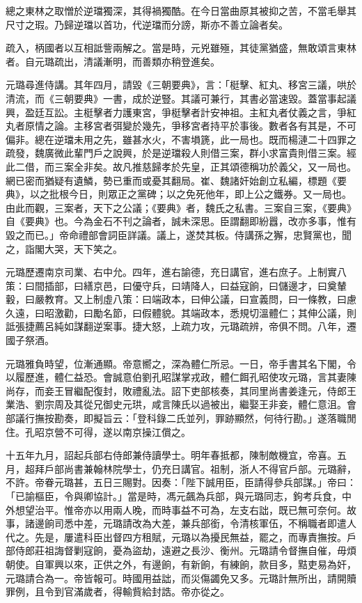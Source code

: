 \begin{pinyinscope}
總之東林之取憎於逆璫獨深，其得禍獨酷。在今日當曲原其被抑之苦，不當毛舉其尺寸之瑕。乃歸逆璫以首功，代逆璫而分謗，斯亦不善立論者矣。

疏入，柄國者以互相詆訾兩解之。當是時，元兇雖殛，其徒黨猶盛，無敢頌言東林者。自元璐疏出，清議漸明，而善類亦稍登進矣。

元璐尋進侍講。其年四月，請毀《三朝要典》，言：「梃擊、紅丸、移宮三議，哄於清流，而《三朝要典》一書，成於逆豎。其議可兼行，其書必當速毀。蓋當事起議興，盈廷互訟。主梃擊者力護東宮，爭梃擊者計安神祖。主紅丸者仗義之言，爭紅丸者原情之論。主移宮者弭變於幾先，爭移宮者持平於事後。數者各有其是，不可偏非。總在逆璫未用之先，雖甚水火，不害塤篪，此一局也。既而楊漣二十四罪之疏發，魏廣微此輩門戶之說興，於是逆璫殺人則借三案，群小求富貴則借三案。經此二借，而三案全非矣。故凡推慈歸孝於先皇，正其頌德稱功於義父，又一局也。網已密而猶疑有遺鱗，勢已重而或憂其翻局。崔、魏諸奸始創立私編，標題《要典》，以之批根今日，則眾正之黨碑；以之免死他年，即上公之鐵券。又一局也。由此而觀，三案者，天下之公議；《要典》者，魏氏之私書。三案自三案，《要典》自《要典》也。今為金石不刊之論者，誠未深思。臣謂翻即紛囂，改亦多事，惟有毀之而已。」帝命禮部會詞臣詳議。議上，遂焚其板。侍講孫之獬，忠賢黨也，聞之，詣閣大哭，天下笑之。

元璐歷遷南京司業、右中允。四年，進右諭德，充日講官，進右庶子。上制實八策：曰間插部，曰繕京邑，曰優守兵，曰靖降人，曰益寇餉，曰儲邊才，曰奠輦轂，曰嚴教育。又上制虛八策：曰端政本，曰伸公議，曰宣義問，曰一條教，曰慮久遠，曰昭激勸，曰勵名節，曰假體貌。其端政本，悉規切溫體仁；其伸公議，則詆張捷薦呂純如謀翻逆案事。捷大怒，上疏力攻，元璐疏辨，帝俱不問。八年，遷國子祭酒。

元璐雅負時望，位漸通顯。帝意嚮之，深為體仁所忌。一日，帝手書其名下閣，令以履歷進，體仁益恐。會誠意伯劉孔昭謀掌戎政，體仁餌孔昭使攻元璐，言其妻陳尚存，而妾王冒繼配復封，敗禮亂法。詔下吏部核奏，其同里尚書姜逢元，侍郎王業浩、劉宗周及其從兄御史元珙，咸言陳氏以過被出，繼娶王非妾，體仁意沮。會部議行撫按勘奏，即擬旨云：「登科錄二氏並列，罪跡顯然，何待行勘。」遂落職閒住。孔昭京營不可得，遂以南京操江償之。

十五年九月，詔起兵部右侍郎兼侍讀學士。明年春抵都，陳制敵機宜，帝喜。五月，超拜戶部尚書兼翰林院學士，仍充日講官。祖制，浙人不得官戶部。元璐辭，不許。帝眷元璐甚，五日三賜對。因奏：「陛下誠用臣，臣請得參兵部謀。」帝曰：「已諭樞臣，令與卿協計。」當是時，馮元飆為兵部，與元璐同志，鉤考兵食，中外想望治平。惟帝亦以用兩人晚，而時事益不可為，左支右詘，既已無可奈何。故事，諸邊餉司悉中差，元璐請改為大差，兼兵部銜，令清核軍伍，不稱職者即遣人代之。先是，屢遣科臣出督四方租賦，元璐以為擾民無益，罷之，而專責撫按。戶部侍郎莊祖誨督剿寇餉，憂為盜劫，遠避之長沙、衡州。元璐請令督撫自催，毋煩朝使。自軍興以來，正供之外，有邊餉，有新餉，有練餉，款目多，黠吏易為奸，元璐請合為一。帝皆報可。時國用益詘，而災傷蠲免又多。元璐計無所出，請開贖罪例，且令到官滿歲者，得輸貲給封誥。帝亦從之。


\end{pinyinscope}
